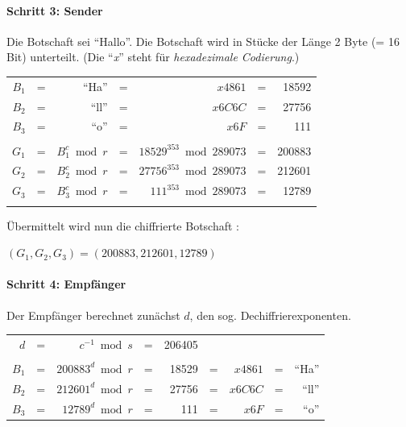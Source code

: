\paragraph{Schritt 3: Sender}
Die Botschaft sei ``Hallo''. Die Botschaft wird in Stücke der Länge 2
Byte (= 16 Bit) unterteilt. (Die ``\textit{x}'' steht für \textit{hexadezimale Codierung}.)

\begin{tabular}{rcrcrcr}
\\
      \(B_1\) &=& ``Ha''            &=& \(x4861\)                    &=& 18592 \\
      \(B_2\) &=& ``ll''            &=& \(x6C6C\)                    &=& 27756               \\
      \(B_3\) &=& ``o''             &=& \(x6F\)                      &=& 111                 \\
      \\
      \(G_1\) &=& \(B_1^c \bmod r\) &=& \(18529^{353} \bmod 289073\) &=& 200883 \\
      \(G_2\) &=& \(B_2^c \bmod r\) &=& \(27756^{353} \bmod 289073\) &=& 212601 \\
      \(G_3\) &=& \(B_3^c \bmod r\) &=& \(  111^{353} \bmod 289073\) &=& 12789 \\
\\
\end{tabular}


Übermittelt wird nun die chiffrierte Botschaft :

		\((G_1, G_2, G_3) = (200883, 212601, 12789)\)

\paragraph{Schritt 4: Empfänger}
Der Empfänger berechnet zunächst \(d\), den sog. Dechiffrierexponenten.\\

\begin{tabular}{rcrcrcrcr}
	\(d\)   &=& \(c^{-1}   \bmod s\) &=& 206405  & &           & &        \\
        \\
	\(B_1\) &=& \(200883^d \bmod r\) &=& 18529   &=& \(x4861\) &=& ``Ha'' \\
	\(B_2\) &=& \(212601^d \bmod r\) &=& 27756   &=& \(x6C6C\) &=& ``ll'' \\
	\(B_3\) &=& \(12789^d  \bmod r\) &=& 111     &=& \(x6F\)   &=& ``o''
\end{tabular}

